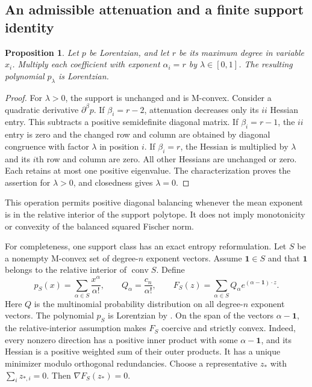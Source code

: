 \documentclass[11pt,a4paper]{article}
\newtheorem{proposition}[theorem]{Proposition}
\theoremstyle{definition}
\theoremstyle{remark}
\begin{document}
\subsection{An admissible attenuation and a finite support identity}

\begin{proposition}\label{prop:lp-attenuation}
Let $p$ be Lorentzian, and let $r$ be its maximum degree in variable $x_i$.
Multiply each coefficient with exponent $\alpha_i=r$ by $\lambda\in[0,1]$.
The resulting polynomial $p_\lambda$ is Lorentzian.
\end{proposition}
\begin{proof}
For $\lambda>0$, the support is unchanged and is M-convex.
Consider a quadratic derivative $\partial^\beta p$.
If $\beta_i=r-2$, attenuation decreases only its $ii$ Hessian entry.
This subtracts a positive semidefinite diagonal matrix.
If $\beta_i=r-1$, the $ii$ entry is zero and the changed row and column are obtained by diagonal congruence with factor $\lambda$ in position $i$.
If $\beta_i=r$, the Hessian is multiplied by $\lambda$ and its $i$th row and column are zero.
All other Hessians are unchanged or zero.
Each retains at most one positive eigenvalue.
The characterization proves the assertion for $\lambda>0$, and closedness gives $\lambda=0$.
\end{proof}

This operation permits positive diagonal balancing whenever the mean exponent is in the relative interior of the support polytope.
It does not imply monotonicity or convexity of the balanced squared Fischer norm.

For completeness, one support class has an exact entropy reformulation.
Let $S$ be a nonempty M-convex set of degree-$n$ exponent vectors.
Assume $\mathbf1\in S$ and that $\mathbf1$ belongs to the relative interior of $\operatorname{conv}S$.
Define
\[
 p_S(x)=\sum_{\alpha\in S}\frac{x^\alpha}{\alpha!},\qquad
 Q_\alpha=\frac{c_n}{\alpha!},\qquad
 F_S(z)=\sum_{\alpha\in S}Q_\alpha e^{(\alpha-\mathbf1)\cdot z}.
\]
Here $Q$ is the multinomial probability distribution on all degree-$n$ exponent vectors.
The polynomial $p_S$ is Lorentzian by \citet[Theorem~3.10]{brandenhuh2020}.
On the span of the vectors $\alpha-\mathbf1$, the relative-interior assumption makes $F_S$ coercive and strictly convex.
Indeed, every nonzero direction has a positive inner product with some $\alpha-\mathbf1$, and its Hessian is a positive weighted sum of their outer products.
It has a unique minimizer modulo orthogonal redundancies.
Choose a representative $z_*$ with $\sum_i z_{*,i}=0$.
Then $\nabla F_S(z_*)=0$.
\end{document}
